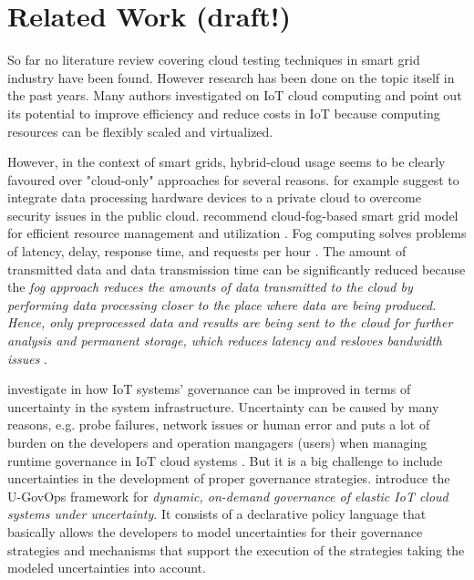 \section{Related Work (draft!)}
So far no literature review covering cloud testing techniques in smart grid industry have been found. However research has been done on the topic itself in the past years. Many authors investigated on IoT cloud computing and point out its potential to improve efficiency and reduce costs in IoT because computing resources can be flexibly scaled and virtualized.

However, in the context of smart grids, hybrid-cloud usage seems to be clearly favoured over "cloud-only" approaches for several reasons. \citeauthor{talaat2020hybrid} for example suggest to integrate data processing hardware devices to a private cloud to overcome security issues in the public cloud. \citeauthor{zahoor2018cloudmanag} recommend cloud-fog-based smart grid model for efficient resource management \cite{zahoor2018cloudmanag} and utilization \cite{zahoor2018cloudutil}. Fog computing solves problems of latency, delay, response time, and requests per hour \cite{zahoor2018cloudmanag}. The amount of transmitted data and data transmission time can be significantly reduced because the \textit{fog approach reduces the amounts of data transmitted to the cloud by performing data processing closer to the place where data are being produced. Hence, only preprocessed data and results are being sent to the cloud for further analysis and permanent storage, which reduces latency and resloves bandwidth issues} \cite{forcan2020cloud}.

\citeauthor{7396147} investigate in how IoT systems' governance can be improved in terms of uncertainty in the system infrastructure. Uncertainty can be caused by many reasons, e.g. probe failures, network issues or human error and puts a lot of burden on the developers and operation mangagers (users) when managing runtime governance in IoT cloud systems \cite{7396147}. But it is a big challenge to include uncertainties in the development of proper governance strategies. \citeauthor{7396147} introduce the U-GovOps framework for \textit{dynamic, on-demand governance of elastic IoT cloud systems under uncertainty}. It consists of a declarative policy language that basically allows the developers to model uncertainties for their governance strategies and mechanisms that support the execution of the strategies taking the modeled uncertainties into account.

